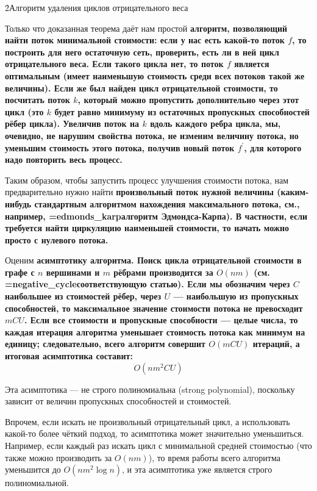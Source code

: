 \h2{Алгоритм удаления циклов отрицательного веса}

Только что доказанная теорема даёт нам простой \bf{алгоритм}, позволяющий найти поток минимальной стоимости: если у нас есть какой-то поток $f$, то построить для него остаточную сеть, проверить, есть ли в ней цикл отрицательного веса. Если такого цикла нет, то поток $f$ является оптимальным (имеет наименьшую стоимость среди всех потоков такой же величины). Если же был найден цикл отрицательной стоимости, то посчитать поток $k$, который можно пропустить дополнительно через этот цикл (это $k$ будет равно минимуму из остаточных пропускных способностей рёбер цикла). Увеличив поток на $k$ вдоль каждого ребра цикла, мы, очевидно, не нарушим свойства потока, не изменим величину потока, но уменьшим стоимость этого потока, получив новый поток $f^\prime$, для которого надо повторить весь процесс.

Таким образом, чтобы запустить процесс улучшения стоимости потока, нам предварительно нужно найти \bf{произвольный поток нужной величины} (каким-нибудь стандартным алгоритмом нахождения максимального потока, см., например, \algohref=edmonds_karp{алгоритм Эдмондса-Карпа}). В частности, если требуется найти циркуляцию наименьшей стоимости, то начать можно просто с нулевого потока.

Оценим \bf{асимптотику} алгоритма. Поиск цикла отрицательной стоимости в графе с $n$ вершинами и $m$ рёбрами производится за $O(nm)$ (см. \algohref=negative_cycle{соответствующую статью}). Если мы обозначим через $C$ наибольшее из стоимостей рёбер, через $U$ --- наибольшую из пропускных способностей, то максимальное значение стоимости потока не превосходит $mCU$. Если все стоимости и пропускные способности --- целые числа, то каждая итерация алгоритма уменьшает стоимость потока как минимум на единицу; следовательно, всего алгоритм совершит $O(mCU)$ итераций, а итоговая асимптотика составит:
$$ O(nm^2CU) $$

Эта асимптотика --- не строго полиномиальна (strong polynomial), поскольку зависит от величин пропускных способностей и стоимостей.

Впрочем, если искать не произвольный отрицательный цикл, а использовать какой-то более чёткий подход, то асимптотика может значительно уменьшиться. Например, если каждый раз искать цикл с минимальной средней стоимостью (что также можно производить за $O(nm)$), то время работы всего алгоритма уменьшится до $O(nm^2 \log n)$, и эта асимптотика уже является строго полиномиальной.

